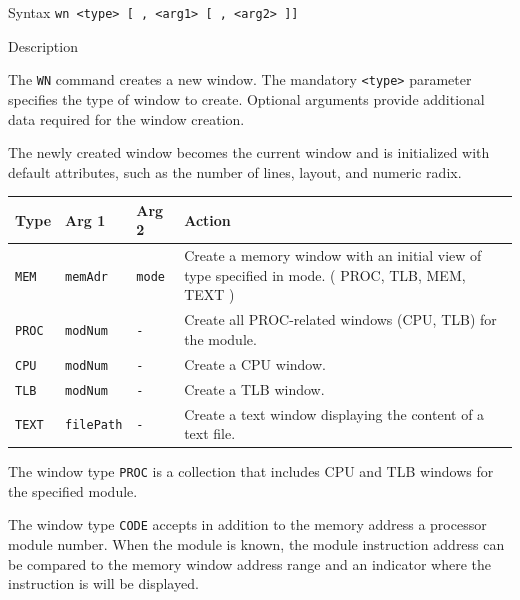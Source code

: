 %
%
\pagebreak
{}

\begin{iPageDescEntry}{Syntax}
\texttt{wn <type> [ , <arg1> [ , <arg2> ]] } \\
\end{iPageDescEntry}

\begin{iPageDescEntry}{Description}

The \texttt{WN} command creates a new window. The mandatory \texttt{<type>}
parameter specifies the type of window to create. Optional arguments provide
additional data required for the window creation.

The newly created window becomes the current window and is initialized with
default attributes, such as the number of lines, layout, and numeric radix.

\begin{flushleft}
\begin{tabularx}{\textwidth}{|l|X|X|p{5cm}|}
\hline
\textbf{Type} & \textbf{Arg 1} & \textbf{Arg 2} & \textbf{Action} \\ \hline
\texttt{MEM}         & \texttt{memAdr} & \texttt{mode} & Create a memory window with an initial view of type specified in mode. ( PROC, TLB, MEM, TEXT ) \\ \hline
\texttt{PROC}        & \texttt{modNum} & \texttt{-} & Create all PROC-related windows (CPU, TLB) for the module. \\ \hline
\texttt{CPU}         & \texttt{modNum} & \texttt{-} & Create a CPU window. \\ \hline
\texttt{TLB}         & \texttt{modNum} & \texttt{-} & Create a TLB window. \\ \hline
\texttt{TEXT}        & \texttt{filePath} & \texttt{-} & Create a text window displaying the content of a text file. \\ \hline
\end{tabularx}
\end{flushleft}

The window type \texttt{PROC} is a collection that includes CPU and TLB  windows for the specified module.

The window type \texttt{CODE} accepts in addition to the memory address a processor module number. When the module is known, the module instruction address can be compared to the memory window address range and an indicator where the instruction is will be displayed.

\end{iPageDescEntry}

